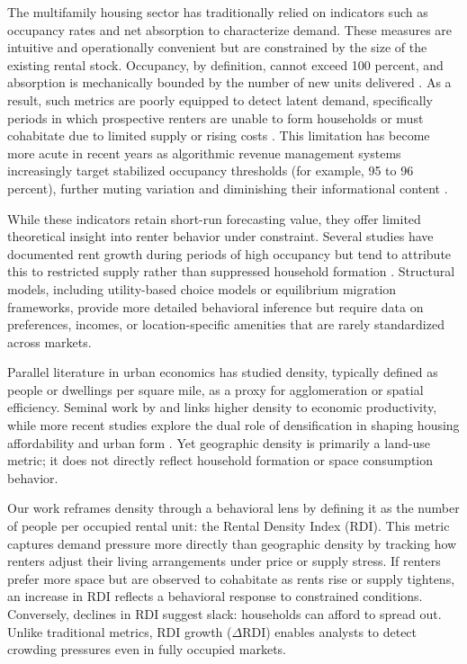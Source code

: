 \documentclass[APA,Times1COL]{WileyNJDv5} %
\begin{document}
The multifamily housing sector has traditionally relied on indicators such as occupancy rates and net absorption to characterize demand. These measures are intuitive and operationally convenient but are constrained by the size of the existing rental stock. Occupancy, by definition, cannot exceed 100 percent, and absorption is mechanically bounded by the number of new units delivered \cite{mueller1999real, gabriel2001rental}. As a result, such metrics are poorly equipped to detect latent demand, specifically periods in which prospective renters are unable to form households or must cohabitate due to limited supply or rising costs \cite{sirmans1991determinants, pyhrr1999real}. This limitation has become more acute in recent years as algorithmic revenue management systems increasingly target stabilized occupancy thresholds (for example, 95 to 96 percent), further muting variation and diminishing their informational content \cite{calder2024coordinated}.

While these indicators retain short-run forecasting value, they offer limited theoretical insight into renter behavior under constraint. Several studies have documented rent growth during periods of high occupancy but tend to attribute this to restricted supply rather than suppressed household formation \cite{goodman1992rental, wheaton1991realestate}. Structural models, including utility-based choice models \cite{rosenthal1997housing} or equilibrium migration frameworks, provide more detailed behavioral inference but require data on preferences, incomes, or location-specific amenities that are rarely standardized across markets.

Parallel literature in urban economics has studied density, typically defined as people or dwellings per square mile, as a proxy for agglomeration or spatial efficiency. Seminal work by \cite{glaeser2001cities} and \cite{duranton2004micro} links higher density to economic productivity, while more recent studies explore the dual role of densification in shaping housing affordability and urban form \cite{ahlfeldt2019economic, albouy2015driving}. Yet geographic density is primarily a land-use metric; it does not directly reflect household formation or space consumption behavior.

Our work reframes density through a behavioral lens by defining it as the number of people per occupied rental unit: the Rental Density Index (RDI). This metric captures demand pressure more directly than geographic density by tracking how renters adjust their living arrangements under price or supply stress. If renters prefer more space but are observed to cohabitate as rents rise or supply tightens, an increase in RDI reflects a behavioral response to constrained conditions. Conversely, declines in RDI suggest slack: households can afford to spread out. Unlike traditional metrics, RDI growth (\( \Delta \text{RDI} \)) enables analysts to detect crowding pressures even in fully occupied markets.
\end{document}
